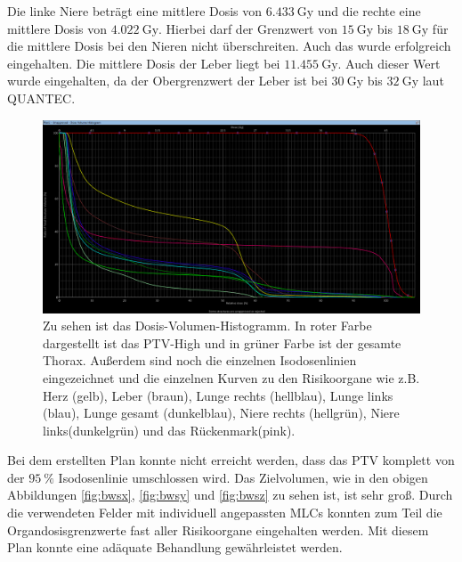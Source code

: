 Die linke Niere beträgt eine mittlere Dosis von $\SI{6,433}{\gray}$ und die rechte eine mittlere Dosis von $\SI{4,022}{\gray}$. Hierbei darf der Grenzwert von $\SI{15}{\gray}$ bis $\SI{18}{\gray}$ für die mittlere Dosis bei den Nieren nicht überschreiten. Auch das wurde erfolgreich eingehalten. 
Die mittlere Dosis der Leber liegt bei $\SI{11,455}{\gray}$. Auch dieser Wert wurde eingehalten, da der Obergrenzwert der Leber ist bei $\SI{30}{\gray}$ bis $\SI{32}{\gray}$ laut QUANTEC. 

\begin{figure}[h!]
	\centering
	\includegraphics[width=0.7\linewidth]{Bilder/BWS_DVH}
	\caption{Zu sehen ist das Dosis-Volumen-Histogramm. In roter Farbe dargestellt ist das PTV-High und in grüner Farbe ist der gesamte Thorax. Außerdem sind noch die einzelnen Isodosenlinien eingezeichnet und die einzelnen Kurven zu den Risikoorgane wie z.B. Herz (gelb), Leber (braun), Lunge rechts (hellblau), Lunge links (blau), Lunge gesamt (dunkelblau), Niere rechts (hellgrün), Niere links(dunkelgrün) und das Rückenmark(pink).}
	\label{fig:bwsdvh}
\end{figure}

Bei dem erstellten Plan konnte nicht erreicht werden, dass das PTV komplett von der $\SI{95}{\percent}$ Isodosenlinie umschlossen wird. Das Zielvolumen, wie in den obigen Abbildungen \ref{fig:bwsx}, \ref{fig:bwsy} und \ref{fig:bwsz} zu sehen ist, ist sehr groß. Durch die verwendeten Felder mit individuell angepassten MLCs konnten zum Teil die Organdosisgrenzwerte fast aller Risikoorgane eingehalten werden. Mit diesem Plan konnte eine adäquate Behandlung gewährleistet werden. 